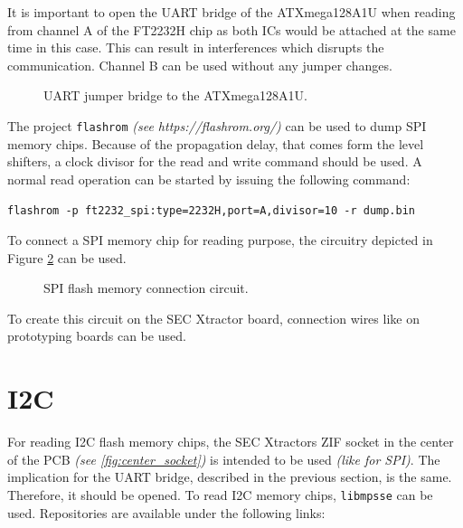 \documentclass[a4paper]{report}
\begin{document}
It is important to open the UART bridge of the ATXmega128A1U when reading from channel A of the FT2232H chip as both ICs would be attached at the same time in this case.
This can result in interferences which disrupts the communication.
Channel B can be used without any jumper changes.
\begin{figure}[ht] 
  \centering
  {
   \setlength{\fboxsep}{0pt}
   \setlength{\fboxrule}{0.5pt}
  }
  \caption{UART jumper bridge to the ATXmega128A1U.}
  \label{fig:uart_jumper}
\end{figure}
The project \texttt{flashrom} \textit{(see https://flashrom.org/)} can be used to dump SPI memory chips.
Because of the propagation delay, that comes form the level shifters, a clock divisor for the read and write command should be used.
A normal read operation can be started by issuing the following command:

\texttt{flashrom -p ft2232\_spi:type=2232H,port=A,divisor=10 -r dump.bin}

To connect a SPI memory chip for reading purpose, the circuitry depicted in Figure \ref{fig:SPI_circuit} can be used.
\begin{figure}[ht] 
  \centering
  {
   \setlength{\fboxsep}{0pt}
   \setlength{\fboxrule}{0.5pt}
  }
  \caption{SPI flash memory connection circuit.}
  \label{fig:SPI_circuit}
\end{figure}
To create this circuit on the SEC Xtractor board, connection wires like on prototyping boards can be used.
\section{I2C}
For reading I2C flash memory chips, the SEC Xtractors ZIF socket in the center of the PCB \textit{(see \ref{fig:center_socket})} is intended to be used \textit{(like for SPI)}.
The implication for the UART bridge, described in the previous section, is the same.
Therefore, it should be opened.
To read I2C memory chips, \texttt{libmpsse} can be used.
Repositories are available under the following links: 
\end{document}
